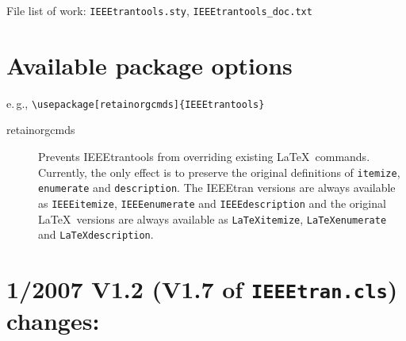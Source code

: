 \documentclass[pagesize=auto]{scrartcl}
\begin{document}
File list of work: \texttt{IEEEtrantools.sty}, \texttt{IEEEtrantools\_doc.txt}


\section{Available package options}

e.\,g., \verb+\usepackage[retainorgcmds]{IEEEtrantools}+

\begin{description}
\item[retainorgcmds]
  Prevents \textsf{IEEEtrantools} from overriding existing \LaTeX\ commands.
  Currently, the only effect is to preserve the original definitions
  of \texttt{itemize}, \texttt{enumerate} and \texttt{description}. The \textsf{IEEEtran} versions are
  always available as \texttt{IEEEitemize}, \texttt{IEEEenumerate} and \texttt{IEEEdescription}
  and the original \LaTeX\ versions are always available as \texttt{LaTeXitemize},
  \texttt{LaTeXenumerate} and \texttt{LaTeXdescription}.
\end{description}


\section{1/2007 V1.2 (V1.7 of \texttt{IEEEtran.cls}) changes:}
\end{document}

